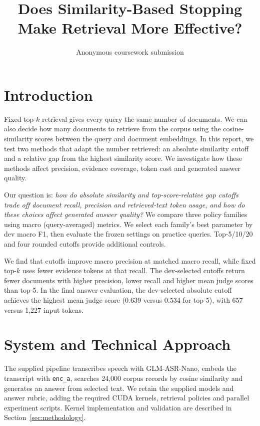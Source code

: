 \documentclass{article}
\title{Does Similarity-Based Stopping\\Make Retrieval More Effective?}
\author{Anonymous coursework submission}
\begin{document}
\maketitle
{}

\section{Introduction}\label{sec:introduction}
Fixed top-$k$ retrieval gives every query the same number of documents. We can also decide how many documents to retrieve from the corpus using the cosine-similarity scores between the query and document embeddings. In this report, we test two methods that adapt the number retrieved: an absolute similarity cutoff and a relative gap from the highest similarity score. We investigate how these methods affect precision, evidence coverage, token cost and generated answer quality.

Our question is: \emph{how do absolute similarity and top-score-relative gap cutoffs trade off document recall, precision and retrieved-text token usage, and how do these choices affect generated answer quality?} We compare three policy families using macro (query-averaged) metrics. We select each family's best parameter by dev macro F1, then evaluate the frozen settings on practice queries. Top-5/10/20 and four rounded cutoffs provide additional controls.

We find that cutoffs improve macro precision at matched macro recall, while fixed top-$k$ uses fewer evidence tokens at that recall. The dev-selected cutoffs return fewer documents with higher precision, lower recall and higher mean judge scores than top-5. In the final answer evaluation, the dev-selected absolute cutoff achieves the highest mean judge score (0.639 versus 0.534 for top-5), with 657 versus 1,227 input tokens.

\section{System and Technical Approach}\label{sec:approach}
The supplied pipeline transcribes speech with GLM-ASR-Nano, embeds the transcript with \texttt{enc\_a}, searches 24,000 corpus records by cosine similarity and generates an answer from selected text. We retain the supplied models and answer rubric, adding the required CUDA kernels, retrieval policies and parallel experiment scripts. Kernel implementation and validation are described in Section~\ref{sec:methodology}.
\end{document}
